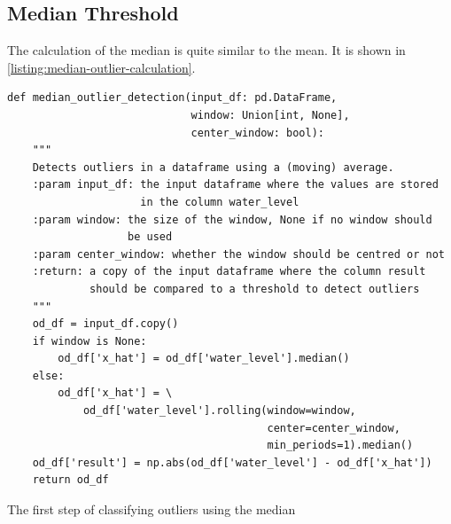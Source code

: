 \subsection{Median Threshold}
The calculation of the median is quite similar to the mean. It is shown in \autoref{listing:median-outlier-calculation}.
\begin{listing}
\begin{verbatim}
def median_outlier_detection(input_df: pd.DataFrame,
                             window: Union[int, None],
                             center_window: bool):
    """
    Detects outliers in a dataframe using a (moving) average.
    :param input_df: the input dataframe where the values are stored
                     in the column water_level
    :param window: the size of the window, None if no window should
                   be used
    :param center_window: whether the window should be centred or not
    :return: a copy of the input dataframe where the column result
             should be compared to a threshold to detect outliers
    """
    od_df = input_df.copy()
    if window is None:
        od_df['x_hat'] = od_df['water_level'].median()
    else:
        od_df['x_hat'] = \
            od_df['water_level'].rolling(window=window,
                                         center=center_window,
                                         min_periods=1).median()
    od_df['result'] = np.abs(od_df['water_level'] - od_df['x_hat'])
    return od_df
\end{verbatim}
\caption{The first step of classifying outliers using the median}
\label{listing:median-outlier-calculation}
\end{listing}

